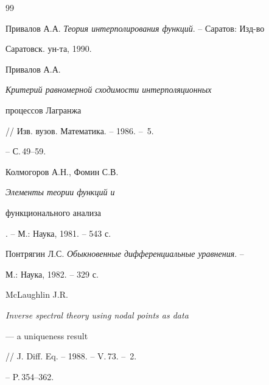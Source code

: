 \begin{thebibliography}{99}


Привалов А.А. {\em Теория интерполирования функций}. -- Саратов: Изд-во 


Саратовск. ун-та, 1990. 




Привалов А.А. {\em Критерий равномерной сходимости интерполяционных 


процессов Лагранжа} // Изв. вузов. Математика. -- 1986. -- \No\,5. 


-- С.\,49--59. 




Колмогоров А.Н., Фомин С.В. {\em Элементы теории функций и 


функционального анализа}. -- М.: Наука, 1981. -- 543 с. 




Понтрягин Л.С. {\em Обыкновенные дифференциальные уравнения}. -- 


М.: Наука, 1982. -- 329 с. 


\bibitem{} 


McLaughlin J.R. {\em Inverse spectral theory using nodal points as data 


--- a uniqueness result} // J. Diff. Eq. -- 1988. -- V.\,73. -- \No\,2. 


-- P.\,354--362. 


 


\end{thebibliography} 


 


\vskip 2cm 


 






 


\label{end} 


 


 








